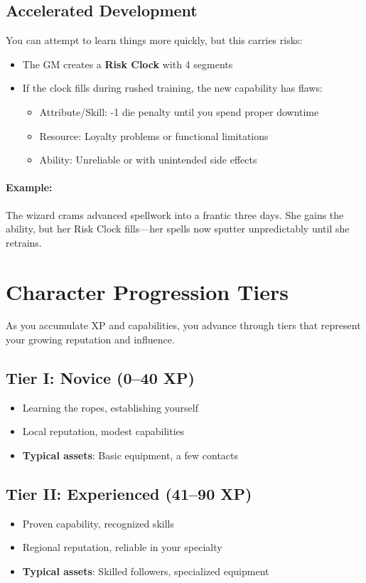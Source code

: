 \begin{multicols}{2}
\subsection*{Accelerated Development}
You can attempt to learn things more quickly, but this carries risks:

\begin{itemize}
\item The GM creates a \textbf{Risk Clock} with 4 segments
\item If the clock fills during rushed training, the new capability has flaws:
\begin{itemize}
\item Attribute/Skill: -1 die penalty until you spend proper downtime
\item Resource: Loyalty problems or functional limitations
\item Ability: Unreliable or with unintended side effects
\end{itemize}
\end{itemize}

\paragraph{Example:}  
The wizard crams advanced spellwork into a frantic three days. She gains the ability, but her Risk Clock fills—her spells now sputter unpredictably until she retrains.

\section{Character Progression Tiers}

As you accumulate XP and capabilities, you advance through tiers that represent your growing reputation and influence.

\subsection*{Tier I: Novice (0–40 XP)}
\begin{itemize}
\item Learning the ropes, establishing yourself
\item Local reputation, modest capabilities
\item \textbf{Typical assets}: Basic equipment, a few contacts
\end{itemize}

\subsection*{Tier II: Experienced (41–90 XP)}
\begin{itemize}
\item Proven capability, recognized skills
\item Regional reputation, reliable in your specialty
\item \textbf{Typical assets}: Skilled followers, specialized equipment
\end{itemize}


\end{multicols}
